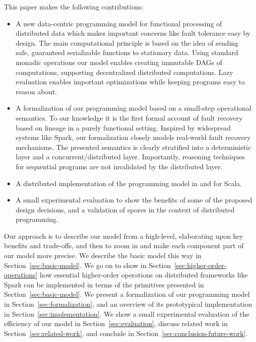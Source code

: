 \documentclass[preprint]{sigplanconf}
\theoremstyle{definition}
\theoremstyle{definition}
\begin{document}
This paper makes the following contributions:
\begin{itemize} %

\item A new data-centric programming model for functional processing of
distributed data which makes important concerns like fault tolerance easy by
design. The main computational principle is based on the idea of sending safe,
guaranteed serializable functions to stationary data. Using standard monadic
operations our model enables creating immutable DAGs of computations,
supporting decentralized distributed computations. Lazy evaluation enables
important optimizations while keeping programs easy to reason about.

\item A formalization of our programming model based on a small-step
operational  semantics. To our knowledge it is the first formal account of
fault recovery based on lineage in a purely functional setting. Inspired by
widespread systems like Spark, our formalization closely models real-world
fault recovery mechanisms. The presented semantics is clearly stratified into
a deterministic layer and a concurrent/distributed layer. Importantly,
reasoning techniques for sequential programs are not invalidated by the
distributed layer.

\item A distributed implementation of the programming model in and for Scala.

\item A small experimental evaluation to show the benefits of some of  the
proposed design decisions, and a validation of spores in the context of
distributed programming.


\end{itemize}


Our approach is to describe our model from a high-level, elaborating upon key
benefits and trade-offs, and then to zoom in and make each component part of
our model more precise. We describe the basic model this way in
Section~\ref{sec:basic-model}. We go on to show in Section~\ref{sec:higher-order-operations}
how essential higher-order operations on distributed
frameworks like Spark can be implemented in terms of the primitives presented
in Section~\ref{sec:basic-model}. We present a formalization of our
programming model in Section~\ref{sec:formalization}, and an overview of its
prototypical implementation in Section~\ref{sec:implementation}. We show a
small experimental evaluation of the efficiency of our model in
Section~\ref{sec:evaluation}, discuss related work in Section~\ref{sec:related-work},
and conclude in Section~\ref{sec:conclusion-future-work}.
\end{document}
